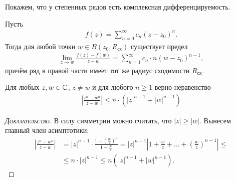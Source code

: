 \documentclass[../complex-analysis.tex]{subfiles}
\begin{document}
Покажем, что у степенных рядов есть комплексная дифференцируемость.

\begin{crly}
 \label{corollary:complex_differential_of_}
 Пусть
 \begin{align*}
  f(z) = \sum_{n=0}^{\infty} c_n(z - z_0)^{n}.
 \end{align*} Тогда для любой точки $w \in B(z_0, R_{\text{сх}})$ существует предел
 \begin{align*}
  \lim_{z \to w} \frac{f(z) - f(w)}{z - w} = \sum_{n=1}^{\infty} c_n \cdot n (w - z_0)^{n-1},
 \end{align*} причём ряд в правой части имеет тот же радиус сходимости $R_{\text{сх}}$.
\end{crly}
\begin{lm}
 \label{lemma:complex_n_w_inequality}
 Для любых $z, w \in \mathbb{C}$, $z \neq w$ и для любого $n \geqslant 1$ верно неравенство
 \begin{align*}
  \left|\frac{z^{n} - w^{n}}{z - w} \right| \leqslant n \cdot \left(\left| z \right|^{n-1} + \left| w \right|^{n-1}\right)
 \end{align*} 
\end{lm}
\begin{proof}[\normalfont\textsc{Доказательство}]
 В силу симметрии можно считать, что $\left| z \right| \geqslant \left| w \right|$. Вынесем главный член асимптотики:
 \begin{align*}
   \left|\frac{z^{n} - w^{n}}{z - w} \right| &= \left| z \right|^{n-1} \cdot \frac{1 - \left( \frac{w}{z} \right)^{n}}{1 - \frac{w}{z}} = \left| z \right|^{n-1} \left| 1 + \frac{w}{z} + \ldots + \left( \frac{w}{z} \right)^{n-1} \right| \leqslant \\
  &\leqslant n \cdot \left| z \right|^{n-1} \leqslant n \left( \left| z \right|^{n-1} + \left| w \right|^{n-1} \right).
 \end{align*} 
\end{proof}
\end{document}
